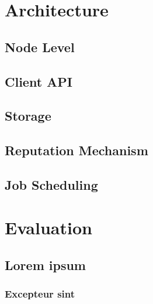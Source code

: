\documentclass{./llncs2e/llncs}
\begin{document}

% 
% 

\section{Architecture}

\subsection{Node Level}

\subsection{Client API}

\subsection{Storage}

\subsection{Reputation Mechanism}

\subsection{Job Scheduling}





% 
% 

\section{Evaluation}

\subsection{Lorem ipsum}

\subsubsection{Excepteur sint}
\end{document}
